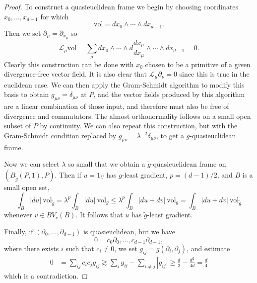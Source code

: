 \documentclass[reqno,12pt,letterpaper]{amsart}
\newcommand{\vol}{\mathrm{vol}}
\theoremstyle{definition}
\numberwithin{equation}{section}
\begin{document}
\begin{proof}
To construct a quasieuclidean frame we begin by choosing coordinates $x_0, \dots, x_{d - 1}$ for which
$$\vol = dx_0 \wedge \cdots \wedge dx_{d - 1}.$$
Then we set $\partial_\mu = \partial_{x_\mu}$ so
$$\mathcal L_\mu\vol = \sum_\mu dx_0 \wedge \cdots \wedge d\frac{dx_\mu}{dx_\mu} \wedge \cdots \wedge dx_{d - 1} = 0.$$
Clearly this construction can be done with $x_0$ chosen to be a primitive of a given divergence-free vector field.
It is also clear that $\mathcal L_\mu \partial_\nu = 0$ since this is true in the euclidean case.
We can then apply the Gram-Schmidt algorithm to modify this basis to obtain $g_{\mu\nu} = \delta_{\mu\nu}$ at $P$, and the vector fields produced by this algorithm are a linear combination of those input, and therefore must also be free of divergence and commutators.
The almost orthonormality follows on a small open subset of $P$ by continuity.
We can also repeat this construction, but with the Gram-Schmidt condition replaced by $g_{\mu\nu} = \lambda^{-2} \delta_{\mu\nu}$, to get a $\tilde g$-quasieuclidean frame.

Now we can select $\lambda$ so small that we obtain a $\tilde g$-quasieuclidean frame on $(B_{\tilde g}(P, 1), P)$.
Then if $u = 1_U$ has $g$-least gradient, $p = (d - 1)/2$, and $B$ is a small open set,
$$\int_B |du| ~\vol_{\tilde g} = \lambda^p \int_B |du| ~\vol_g \leq \lambda^p \int_B |du + dv| ~\vol_g = \int_B |du + dv| ~\vol_{\tilde g}$$
whenever $v \in BV_c(B)$.
It follows that $u$ has $\tilde g$-least gradient.

Finally, if $(\partial_0, \dots, \partial_{d - 1})$ is quasieuclidean, but we have
$$0 = c_0 \partial_0, \dots, c_{d - 1} \partial_{d - 1},$$
where there exists $i$ such that $c_i \neq 0$, we set $g_{ij} = g(\partial_i, \partial_j)$, and estimate
\begin{align*}
0 &= \sum_{ij} c_ic_j g_{ij} \gtrsim \sum_i g_{ii} - \sum_{i \neq j} |g_{ij}| \geq \frac{d}{2} - \frac{d^2}{4d} = \frac{d}{4}
\end{align*}
which is a contradiction.
\end{proof}

\end{document}
